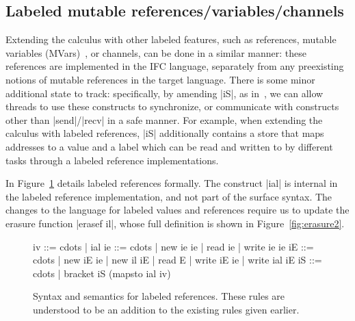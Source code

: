 \subsection{Labeled mutable references/variables/channels}
%
Extending the calculus with other labeled features, such as
references, mutable variables (MVars)~\cite{CH96}, or channels,
can be done in a similar manner: these references are implemented
in the IFC language, separately from any preexisting notions of
mutable references in the target language.
%
%
There is some minor additional state to track: specifically, by amending |iS|, as in~\cite{lio,
stefan:addressing-covert}, we can allow threads to use these
constructs to synchronize, or communicate with constructs other than
|send|/|recv| in a safe manner.
%
For example, when extending the calculus with labeled references, |iS|
additionally contains a store that maps addresses to a value
and a label
which can be read and written to by different tasks through a labeled
reference implementations.

In Figure~\ref{fig:labeled-refs} details labeled references formally.
The construct |ial| is internal in the labeled reference implementation,
and not part of the surface syntax.
The changes to the language for labeled values and
references require us to update the erasure function
|erasef il|, whose full definition is shown in Figure~\ref{fig:erasure2}.


\begin{figure}
  \begin{code}
    iv  ::= cdots | ial
    ie  ::= cdots | new ie ie | read ie | write ie ie
    iE  ::= cdots | new iE ie | new il iE | read E
                  | write iE ie | write ial iE
    iS  ::=  cdots | bracket iS (mapsto ial iv)
  \end{code}
  
  \caption{Syntax and semantics for labeled references.  These rules are
    understood to be an addition to the existing rules given earlier.}
  \label{fig:labeled-refs}
\end{figure}


